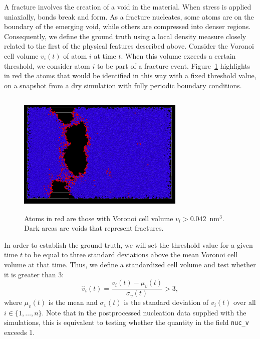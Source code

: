 A fracture involves the creation of a void in the material. When stress is applied uniaxially, bonds break and form.  As a fracture nucleates, some atoms are on the boundary of the emerging void, while others are compressed into denser regions.  Consequently, we define the ground truth using a local density measure closely related to the first of the physical features described above.  Consider the Voronoi cell volume $v_i(t)$ of atom $i$ at time $t$.  When this volume exceeds a certain threshold, we consider atom $i$ to be part of a fracture event.  Figure~\ref{fig:crack_vol} highlights in red the atoms that would be identified in this way with a fixed threshold value, on a snapshot from a dry simulation with fully periodic boundary conditions.

    \begin{figure}
    \centering
    \noindent
    \includegraphics[width=8cm, height=6cm]{picture/volcolor.PNG}
    \caption{Atoms in red are those with Voronoi cell volume $v_i>0.042$~nm$^3$.  Dark areas are voids that represent fractures.}
    \label{fig:crack_vol}
    \end{figure}
    
In order to establish the ground truth, we will set the threshold value for a given time $t$ to be equal to three standard deviations above the mean Voronoi cell volume at that time.  Thus, we define a standardized cell volume and test whether it is greater than 3:
    \begin{equation}
    \hat{v}_i(t) = \frac{v_i(t) - \mu_v(t)}{\sigma_v(t)} > 3,
    \end{equation}
where $\mu_v(t)$ is the mean and $\sigma_v(t)$ is the standard deviation of $v_i(t)$ over all $i\in\{1,\dots,n\}$.  Note that in the postprocessed nucleation data supplied with the simulations, this is equivalent to testing whether the quantity in the field {\tt nuc\_v} exceeds 1.

